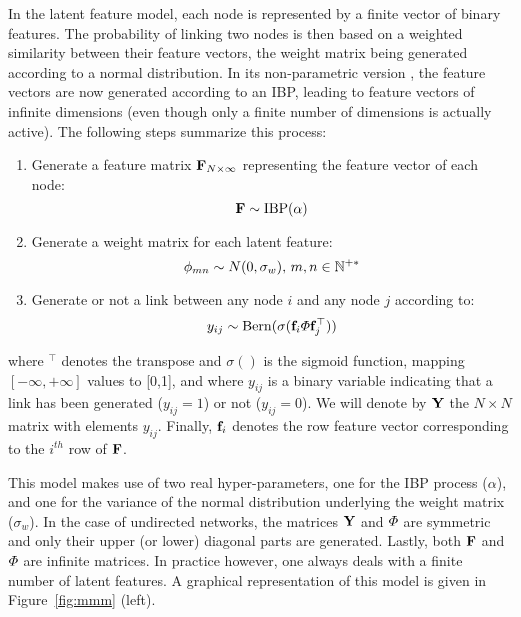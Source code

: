 In the latent feature model, each node is represented by a finite vector of binary features. The probability of linking two nodes is then based on a weighted similarity between their feature vectors, the weight matrix being generated according to a normal distribution. In its non-parametric version \ifm, the feature vectors are now generated according to an IBP, leading to feature vectors of infinite dimensions (even though only a finite number of dimensions is actually active). The following steps summarize this process:~\\
%
\begin{enumerate}
    \item Generate a feature matrix $\mathbf{F}_{N \times \infty}$ representing the feature vector of each node: \[\mathbf{F} \sim \mathrm{IBP}(\alpha)\]
\item Generate a weight matrix for each latent feature:\\
    \[\mathbf{\phi}_{mn} \sim N(0, \sigma_w), \, m,n \in \mathbb{N}^{+*}\]
\item Generate or not a link between any node $i$ and any node $j$ according to: 
%
\begin{equation*}
y_{ij} \sim \mathrm{Bern}(\sigma(\mat{f}_{i} \mat{\Phi} \mat{f}_{j}^\top))
\end{equation*}
\end{enumerate}
%
where $^\top$ denotes the transpose and  $\sigma()$ is the sigmoid function, mapping $[-\infty, +\infty]$ values to [0,1], and where $y_{ij}$ is a binary variable indicating that a link has been generated ($y_{ij}=1$) or not ($y_{ij}=0$). We will denote by $\mathbf{Y}$ the $N \times N$ matrix with elements $y_{ij}$. Finally, $\mathbf{f}_{i}$ denotes the row feature vector corresponding to the $i^{th}$ row of $\mathbf{F}$.

This model makes use of two real hyper-parameters, one for the IBP process ($\alpha$), and one for the variance of the normal distribution underlying the weight matrix ($\sigma_w$). In the case of undirected networks, the matrices $\mathbf{Y}$ and $\mat{\Phi}$ are symmetric and only their upper (or lower) diagonal parts are generated. Lastly, both $\mathbf{F}$ and $\mat{\Phi}$ are infinite matrices. In practice however, one always deals with a finite number of latent features. A graphical representation of this model is given in Figure~\ref{fig:mmm} (left).~\\

